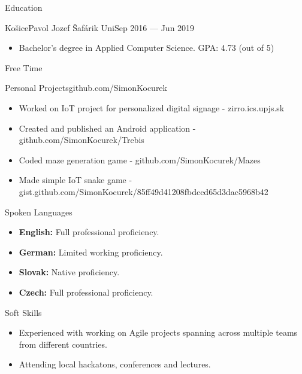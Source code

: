 \documentclass[]{style}
\begin{document}
	\begin{cvsection}{Education}
		\begin{cvsubsection}{Košice}{Pavol Jozef Šafárik Uni}{Sep 2016 — Jun 2019}
			\begin{itemize}
				\item Bachelor's degree in Applied Computer Science. GPA: 4.73 (out of 5)
			\end{itemize}
		\end{cvsubsection}
	\end{cvsection}
	
	\begin{cvsection}{Free Time}
	    \begin{cvsubsection}{Personal Projects}{}{github.com/SimonKocurek}
			\begin{itemize}
			    \item Worked on IoT project for personalized digital signage - zirro.ics.upjs.sk
			    \item Created and published an Android application - github.com/SimonKocurek/Trebis
			    \item Coded maze generation game - github.com/SimonKocurek/Mazes
			    \item Made simple IoT snake game - gist.github.com/SimonKocurek/85ff49d41208fbdccd65d3dac5968b42
			\end{itemize}
		\end{cvsubsection}

	\end{cvsection}
	
	\begin{cvsection}{Spoken Languages}
		\begin{cvsubsection}{}{}{}	
			\begin{itemize}
                \item \textbf{English:} Full professional proficiency.
                \item \textbf{German:} Limited working proficiency.
                \item \textbf{Slovak:} Native proficiency.
                \item \textbf{Czech:} Full professional proficiency.
			\end{itemize}
		\end{cvsubsection}
	\end{cvsection}
	
	\begin{cvsection}{Soft Skills}
		\begin{cvsubsection}{}{}{}	
			\begin{itemize}
                \item Experienced with working on Agile projects spanning across multiple teams from different countries.
                \item Attending local hackatons, conferences and lectures.
			\end{itemize}
		\end{cvsubsection}
	\end{cvsection}
	
	
\end{document}
